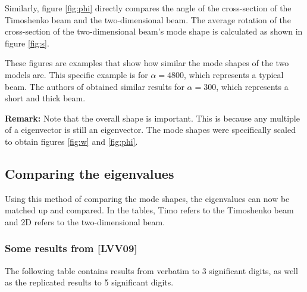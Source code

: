 \documentclass[../../main.tex]{subfiles}
\begin{document}
Similarly, figure \ref{fig:phi} directly compares the angle of the cross-section of the Timoshenko beam and the two-dimensional beam. The average rotation of the cross-section of the two-dimensional beam's mode shape is calculated as shown in figure \ref{fig:s}.

\FloatBarrier
\begin{figure}[ht!]
\end{figure}
\FloatBarrier

These figures are examples that show how similar the mode shapes of the two models are. This specific example is for $\alpha = 4800$, which represents a typical beam. The authors of \cite{LVV09} obtained similar results for $\alpha=300$, which represents a short and thick beam.

\textbf{Remark:} Note that the overall shape is important. This is because any multiple of a eigenvector is still an eigenvector. The mode shapes were specifically scaled to obtain figures \ref{fig:w} and \ref{fig:phi}.

\subsection{Comparing the eigenvalues}
Using this method of comparing the mode shapes, the eigenvalues can now be matched up and compared. In the tables, Timo refers to the Timoshenko beam and 2D refers to the two-dimensional beam.

\subsubsection{Some results from [LVV09]}
The following table contains results from \cite{LVV09} verbatim to 3 significant digits, as well as the replicated results to 5 significant digits.
\end{document}
